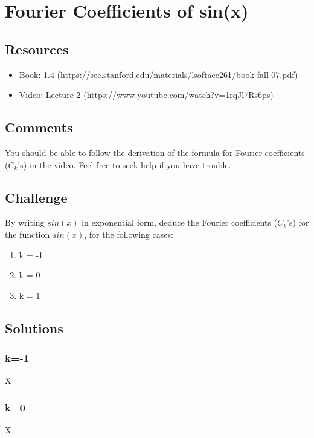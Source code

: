 \section{Fourier Coefficients of sin(x)}
\label{sec:fcsinx}

\subsection*{Resources}
\begin{itemize}
    \item Book: 1.4 (\url{https://see.stanford.edu/materials/lsoftaee261/book-fall-07.pdf})
    \item Video: Lecture 2 (\url{https://www.youtube.com/watch?v=1rqJl7Rs6ps})
\end{itemize}

\subsection*{Comments}
You should be able to follow the derivation of the formula for Fourier coefficients ($C_k$'s) in the video. Feel free to seek help if you have trouble.

\subsection*{Challenge}
By writing $sin(x)$ in exponential form, deduce the Fourier coefficients ($C_k$'s) for the function $sin(x)$, for the following cases:
\begin{enumerate}
    \item k = -1
    \item k = 0
    \item k = 1
\end{enumerate}

\subsection*{Solutions}
\subsubsection{k=-1}
X


\subsubsection{k=0}
X


